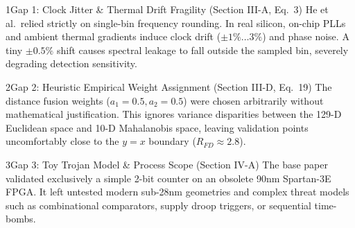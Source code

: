 \documentclass[aspectratio=169,11pt]{beamer}
\begin{document}
\begin{frame}[t]
  \vspace*{-0.18cm}

  \begin{processcardenv}{1}{Gap 1: Clock Jitter \& Thermal Drift Fragility (Section III-A, Eq.\ 3)}
    He et al.\ relied strictly on single-bin frequency rounding. In real silicon, on-chip PLLs and ambient thermal gradients induce clock drift ($\pm 1\%\dots 3\%$) and phase noise. A tiny $\pm 0.5\%$ shift causes spectral leakage to fall outside the sampled bin, severely degrading detection sensitivity.
  \end{processcardenv}
  \vspace{0.03cm}

  \begin{processcardenv}{2}{Gap 2: Heuristic Empirical Weight Assignment (Section III-D, Eq.\ 19)}
    The distance fusion weights ($a_1 = 0.5, a_2 = 0.5$) were chosen arbitrarily without mathematical justification. This ignores variance disparities between the 129-D Euclidean space and 10-D Mahalanobis space, leaving validation points uncomfortably close to the $y=x$ boundary ($R_{FD} \approx 2.8$).
  \end{processcardenv}
  \vspace{0.03cm}

  \begin{processcardenv}{3}{Gap 3: Toy Trojan Model \& Process Scope (Section IV-A)}
    The base paper validated exclusively a simple 2-bit counter on an obsolete 90nm Spartan-3E FPGA. It left untested modern sub-28nm geometries and complex threat models such as combinational comparators, supply droop triggers, or sequential time-bombs.
  \end{processcardenv}
\end{frame}
\end{document}
